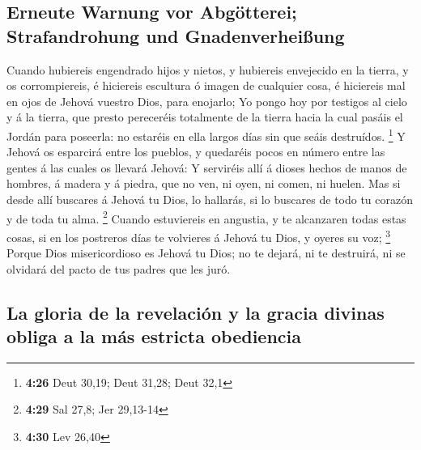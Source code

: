 \hypertarget{erneute-warnung-vor-abguxf6tterei-strafandrohung-und-gnadenverheiuxdfung}{%
\subsection{Erneute Warnung vor Abgötterei; Strafandrohung und
Gnadenverheißung}\label{erneute-warnung-vor-abguxf6tterei-strafandrohung-und-gnadenverheiuxdfung}}

 Cuando hubiereis engendrado hijos y nietos, y hubiereis
envejecido en la tierra, y os corrompiereis, é hiciereis escultura ó
imagen de cualquier cosa, é hiciereis mal en ojos de Jehová vuestro
Dios, para enojarlo;  Yo pongo hoy por testigos al cielo y
á la tierra, que presto pereceréis totalmente de la tierra hacia la cual
pasáis el Jordán para poseerla: no estaréis en ella largos días sin que
seáis destruídos. \footnote{\textbf{4:26} Deut 30,19; Deut 31,28; Deut
  32,1}  Y Jehová os esparcirá entre los pueblos, y
quedaréis pocos en número entre las gentes á las cuales os llevará
Jehová:  Y serviréis allí á dioses hechos de manos de
hombres, á madera y á piedra, que no ven, ni oyen, ni comen, ni huelen.
 Mas si desde allí buscares á Jehová tu Dios, lo hallarás,
si lo buscares de todo tu corazón y de toda tu alma. \footnote{\textbf{4:29}
  Sal 27,8; Jer 29,13-14}  Cuando estuviereis en angustia,
y te alcanzaren todas estas cosas, si en los postreros días te volvieres
á Jehová tu Dios, y oyeres su voz; \footnote{\textbf{4:30} Lev 26,40}
 Porque Dios misericordioso es Jehová tu Dios; no te
dejará, ni te destruirá, ni se olvidará del pacto de tus padres que les
juró.

\hypertarget{la-gloria-de-la-revelaciuxf3n-y-la-gracia-divinas-obliga-a-la-muxe1s-estricta-obediencia}{%
\subsection{La gloria de la revelación y la gracia divinas obliga a la
más estricta
obediencia}\label{la-gloria-de-la-revelaciuxf3n-y-la-gracia-divinas-obliga-a-la-muxe1s-estricta-obediencia}}

